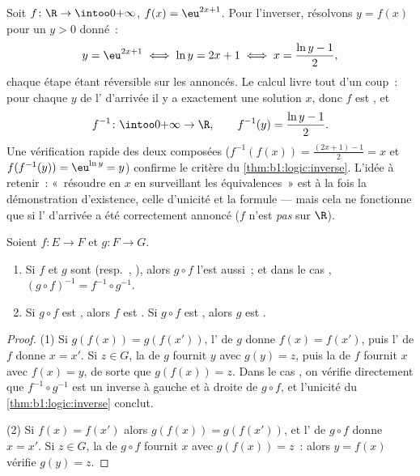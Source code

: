 \begin{example}\label{ex:b1:logic:inversecomp}
Soit $f \colon \R \to \intoo0{+\infty}$, $f(x) = \eu^{2x+1}$. Pour
l'inverser, résolvons $y = f(x)$ pour un $y > 0$ donné~:
\[
y = \eu^{2x+1} \iff \ln y = 2x + 1 \iff x = \frac{\ln y - 1}2 ,
\]
chaque étape étant réversible sur les  annoncés. Le calcul
livre tout d'un coup~: pour chaque $y$ de l' d'arrivée il y a
exactement une solution $x$, donc $f$ est , et
\[
f^{-1} \colon \intoo0{+\infty} \to \R,
\qquad
f^{-1}(y) = \frac{\ln y - 1}2 .
\]
Une vérification rapide des deux composées ($f^{-1}(f(x)) =
\frac{(2x+1) - 1}2 = x$ et $f(f^{-1}(y)) = \eu^{\ln y} = y$) confirme
le critère du \cref{thm:b1:logic:inverse}. L'idée à retenir~:
«~résoudre en $x$ en surveillant les équivalences~» est à la fois la
démonstration d'existence, celle d'unicité et la formule --- mais cela
ne fonctionne que si l' d'arrivée a été correctement annoncé
($f$ n'est \emph{pas}  sur $\R$).
\end{example}

\begin{proposition}\label{prop:b1:logic:comp}
Soient $f \colon E \to F$ et $g \colon F \to G$.
\begin{enumerate}
  \item Si $f$ et $g$ sont  (resp.\ , ),
        alors $g \circ f$ l'est aussi~; et dans le cas ,
        $(g \circ f)^{-1} = f^{-1} \circ g^{-1}$.
  \item Si $g \circ f$ est , alors $f$ est . Si
        $g \circ f$ est , alors $g$ est .
\end{enumerate}
\end{proposition}

\begin{proof}
(1) Si $g(f(x)) = g(f(x'))$, l' de $g$ donne $f(x) = f(x')$,
puis l' de $f$ donne $x = x'$. Si $z \in G$, la 
de $g$ fournit $y$ avec $g(y) = z$, puis la  de $f$ fournit
$x$ avec $f(x) = y$, de sorte que $g(f(x)) = z$. Dans le cas ,
on vérifie directement que $f^{-1} \circ g^{-1}$ est un inverse à
gauche et à droite de $g \circ f$, et l'unicité du
\cref{thm:b1:logic:inverse} conclut.

(2) Si $f(x) = f(x')$ alors $g(f(x)) = g(f(x'))$, et l' de
$g \circ f$ donne $x = x'$. Si $z \in G$, la  de $g \circ f$
fournit $x$ avec $g(f(x)) = z$~: alors $y = f(x)$ vérifie $g(y) = z$.
\end{proof}

